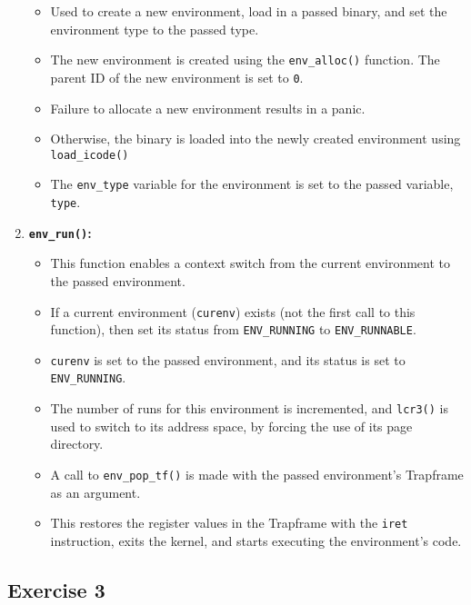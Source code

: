 \documentclass[]{article}
\begin{document}
\begin{enumerate}
  \begin{itemize}
  \itemsep1pt\parskip0pt
  \item
    Used to create a new environment, load in a passed binary, and set
    the environment type to the passed type.
  \item
    The new environment is created using the \texttt{env\_alloc()}
    function. The parent ID of the new environment is set to \texttt{0}.
  \item
    Failure to allocate a new environment results in a panic.
  \item
    Otherwise, the binary is loaded into the newly created environment
    using \texttt{load\_icode()}
  \item
    The \texttt{env\_type} variable for the environment is set to the
    passed variable, \texttt{type}.
  \end{itemize}
\item
  \textbf{\texttt{env\_run()}:}

  \begin{itemize}
  \itemsep1pt\parskip0pt
  \item
    This function enables a context switch from the current environment
    to the passed environment.
  \item
    If a current environment (\texttt{curenv}) exists (not the first
    call to this function), then set its status from
    \texttt{ENV\_RUNNING} to \texttt{ENV\_RUNNABLE}.
  \item
    \texttt{curenv} is set to the passed environment, and its status is
    set to \texttt{ENV\_RUNNING}.
  \item
    The number of runs for this environment is incremented, and
    \texttt{lcr3()} is used to switch to its address space, by forcing
    the use of its page directory.
  \item
    A call to \texttt{env\_pop\_tf()} is made with the passed
    environment's Trapframe as an argument.
  \item
    This restores the register values in the Trapframe with the
    \texttt{iret} instruction, exits the kernel, and starts executing
    the environment's code.
  \end{itemize}
\end{enumerate}

\subsection{Exercise 3}
\end{document}
